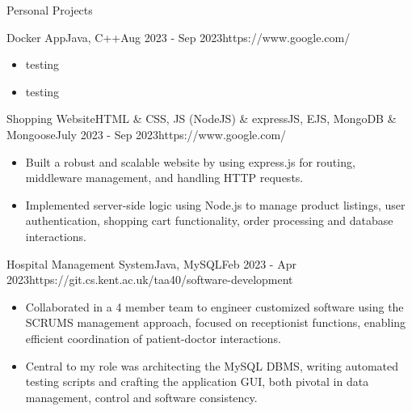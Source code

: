 \documentclass[11pt]{article}
\newlength{\secsep}
\newlength{\seperate}
\newcommand{\coloredhrulefill}[2][black]{%
    \leavevmode%
    \leaders\hbox{\textcolor{#1}{\rule{1ex}{0.5pt}}}\hfill\kern0pt%
}
\newcommand{\lineunder}{\vspace*{-8pt} \hspace*{-6pt} \coloredhrulefill[contactgrey]{}  \\* \vspace*{-8pt}}
\newenvironment{tabbedList}[1]{
	\begin{list}{}{
      \setlength{\itemsep}{0pt}
      \setlength{\labelsep}{0pt}
      \setlength{\labelwidth}{0pt}
      \setlength{\leftmargin}{0pt}
      \setlength{\rightmargin}{0pt}
      \setlength{\listparindent}{0pt}
      \setlength{\parsep}{0pt}
      \setlength{\parskip}{0pt}
      \setlength{\partopsep}{0pt}
      \setlength{\topsep}{#1}
	}
	\item[]
}{\end{list}}
\newenvironment{resume_section}[1] {
	\filbreak
	\vspace{1\secsep}
	\textsc{\Large\textcolor{darkblue}{#1}} \lineunder \vspace*{0.5\secsep}
	\begin{tabbedList}{\secsep}
}{\end{tabbedList}}
\newenvironment{personal_projects}[4] {
	\textbf{#1} \hfill \href{#4}{\color{darkblue}{\faGithub{\footnotesize \hspace*{\secsep}Project Link}}}\\*  %
	{\small Tech Stack: #2} \hfill {\footnotesize \textit{\color{contactgrey}{#3}}}\vspace*{1px}
	
	\begin{tabbedList}{0pt}
}{\end{tabbedList}\vspace*{0.8\secsep}}
\newenvironment{subitems}{
	\vspace*{-2px}
	\renewcommand{\labelitemi}{\color{contactgrey}{\faCode}}
	\begin{itemize}
		\setlength{\labelsep}{0.5em}
		\setlength{\itemsep}{0pt}
		\setlength{\parsep}{0pt}
		\setlength{\topsep}{0px}
}{\end{itemize}}
\begin{document}
	\begin{resume_section}{Personal Projects}
	
		\begin{personal_projects} {Docker App}{Java, C++}{Aug 2023 - Sep 2023}{https://www.google.com/}
			\begin{subitems}
				\item{testing}
				\item{testing}
			\end{subitems}
		\end{personal_projects}	
	
		\vspace*{\seperate}
			
		\begin{personal_projects} {Shopping Website}{HTML \& CSS, JS (NodeJS) \& expressJS, EJS, MongoDB \& Mongoose}{July 2023 - Sep 2023}{https://www.google.com/}
			\begin{subitems}
				\item{Built a robust and scalable website by using express.js for routing, middleware management, and handling HTTP requests.}
				\item{Implemented server-side logic using Node.js to manage product listings, user authentication, shopping cart functionality, order processing and database interactions.}
				\end{subitems}
			\end{personal_projects}
		
		\vspace*{\seperate}	
		
		\begin{personal_projects} {Hospital Management System}{Java, MySQL}{Feb 2023 - Apr 2023}{https://git.cs.kent.ac.uk/taa40/software-development}
			\begin{subitems}
				\item{Collaborated in a 4 member team to engineer customized software using the SCRUMS management approach, focused on receptionist functions, enabling efficient coordination of patient-doctor interactions.}
				\item{Central to my role was architecting the MySQL DBMS, writing automated testing scripts and crafting the application GUI, both pivotal in data management, control and software consistency.}
			\end{subitems}
		\end{personal_projects}		
		

\end{resume_section}
\end{document}
